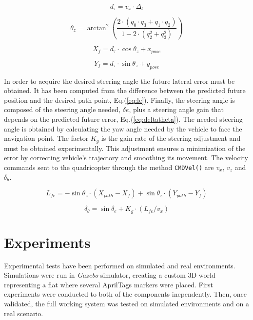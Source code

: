\documentclass{styles/svproc}
\begin{document}
	\begin{equation}
	d_{\tau} = v_{x} \cdot \Delta_{t}
	\label{eq:dtau}
	\end{equation}

	\begin{equation}
	\theta_{z} = \arctan^2 \left( \frac{2 \cdot (q_{0} \cdot q_{3} +q_{1} \cdot q_{2})}{1-2 \cdot (q_{2}^2 + q_{3}^2)}\right)
	\label{eq:euler}
	\end{equation}		
	
	\begin{equation}
	X_{f} = d_{\tau} \cdot \cos \theta_{z} + x_{pose}
	\label{eq:xf}
	\end{equation}
	
	\begin{equation}
	Y_{f} = d_{\tau} \cdot \sin \theta_{z} + y_{pose}
	\label{eq:yf}
	\end{equation}
	
	In order to acquire the desired steering angle the future lateral error must be obtained. It has been computed from the difference between the predicted future position and the desired path point, Eq.(\ref{eq:le}). Finally, the steering angle is composed of the steering angle needed, $\delta{e}$, plus a steering angle gain that depends on the predicted future error, Eq.(\ref{eq:deltatheta}). The needed steering angle is obtained by calculating the yaw angle needed by the vehicle to face the navigation point. The factor $K_{g}$ is the gain rate of the steering adjustment and must be obtained experimentally. This adjustment ensures a minimization of the error by correcting vehicle's trajectory and smoothing its movement. The velocity commands sent to the quadricopter through the method \texttt{CMDVel()} are $v_{x}$, $v_{z}$ and $\delta_{\theta}$. 

	\begin{equation}
	L_{fe} = - \sin \theta_{z} \cdot ( X_{path} - X_{f} ) + \sin \theta_{z} \cdot ( Y_{path} - Y_{f} )
	\label{eq:le}
	\end{equation}

	\begin{equation}
	\delta_{\theta} = \sin \delta_{e} +  K_{g} \cdot ( L_{fe} / v_{x} )
	\label{eq:deltatheta}
	\end{equation}

\section{Experiments}

        Experimental tests have been performed on simulated and real environments. Simulations were run in \textit{Gazebo} simulator, creating a custom 3D world representing a flat where several AprilTags markers were placed. First experiments were conducted to both of the components inependently. Then, once validated, the full working system was tested on simulated environments and on a real scenario.
\end{document}
